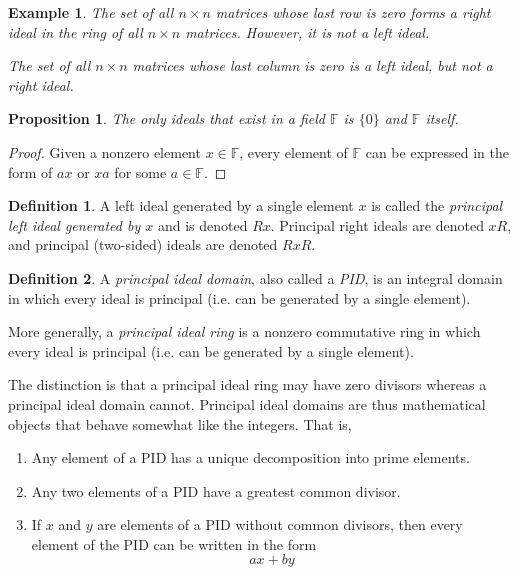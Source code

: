 \documentclass{article}
\newtheorem{proposition}[theorem]{Proposition}
\newtheorem{example}{Example}[section]
\theoremstyle{remark}
\theoremstyle{definition}
\newtheorem{definition}{Definition}[section]
\begin{document}
\begin{example}
The set of all $n \times n$ matrices whose last row is zero forms a right ideal in the ring of all $n \times n$ matrices. However, it is not a left ideal.

The set of all $n\times n$ matrices whose last column is zero is a left ideal, but not a right ideal. 
\end{example}

\begin{proposition}
The only ideals that exist in a field $\mathbb{F}$ is $\{0\}$ and $\mathbb{F}$ itself. 
\end{proposition}
\begin{proof}
Given a nonzero element $x \in \mathbb{F}$, every element of $\mathbb{F}$ can be expressed in the form of $a x$ or $x a$ for some $a \in \mathbb{F}$. 
\end{proof}

\begin{definition}
A left ideal generated by a single element $x$ is called the \textit{principal left ideal generated by $x$} and is denoted $R x$. Principal right ideals are denoted $x R$, and principal (two-sided) ideals are denoted $R x R$. 
\end{definition}

\begin{definition}
A \textit{principal ideal domain}, also called a \textit{PID}, is an integral domain in which every ideal is principal (i.e. can be generated by a single element). 

More generally, a \textit{principal ideal ring} is a nonzero commutative ring in which every ideal is principal (i.e. can be generated by a single element). 
\end{definition}

The distinction is that a principal ideal ring may have zero divisors whereas a principal ideal domain cannot. Principal ideal domains are thus mathematical objects that behave somewhat like the integers. That is, 
\begin{enumerate}
    \item Any element of a PID has a unique decomposition into prime elements. 
    \item Any two elements of a PID have a greatest common divisor. 
    \item If $x$ and $y$ are elements of a PID without common divisors, then every element of the PID can be written in the form 
    \[a x + b y\]
\end{enumerate}
\end{document}
